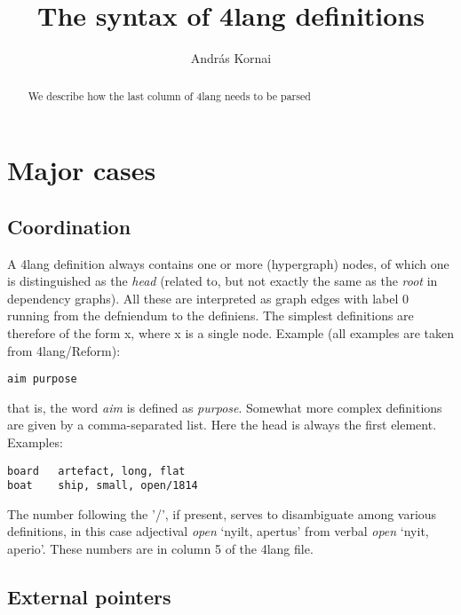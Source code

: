 \documentclass[11pt,bookmarks,bookmarksnumbered,naturalnames,plainpages=false,pdftex,colorlinks=true,urlcolor=blue,bookmarksdepth=subsection,plainpages=false]{paper}
\begin{document}
 
\title{The syntax of 4lang definitions}
\author{Andr\'as Kornai}
\date{}
\maketitle

\begin{abstract}
We describe how the last column of 4lang needs to be parsed
\end{abstract}

\section{Major cases}

\subsection{Coordination}

A 4lang definition always contains one or more (hypergraph) nodes, of which
one is distinguished as the {\it head} (related to, but not exactly the same
as the {\it root} in dependency graphs). All these are interpreted as graph
edges with label 0 running from the defniendum to the definiens.  The simplest
definitions are therefore of the form x, where x is a single node. Example
(all examples are taken from 4lang/Reform):

{\tt aim   purpose}

\noindent
that is, the word {\it aim} is defined as {\it purpose}. Somewhat more complex
definitions are given by a comma-separated list. Here the head is always the
first element. Examples:

\begin{verbatim}
board   artefact, long, flat    
boat    ship, small, open/1814  
\end{verbatim}

The number following the '/', if present, serves to disambiguate among various
definitions, in this case adjectival {\it open} `nyilt, apertus' from verbal
{\it open} `nyit, aperio'. These numbers are in column 5 of the 4lang file. 

\subsection{External pointers}
\end{document}
